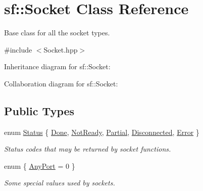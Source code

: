 \hypertarget{classsf_1_1_socket}{}\section{sf\+:\+:Socket Class Reference}
\label{classsf_1_1_socket}


Base class for all the socket types.  




{\ttfamily \#include $<$Socket.\+hpp$>$}



Inheritance diagram for sf\+:\+:Socket\+:


Collaboration diagram for sf\+:\+:Socket\+:
\subsection*{Public Types}
\begin{DoxyCompactItemize}
\item 
enum \hyperlink{classsf_1_1_socket_a51bf0fd51057b98a10fbb866246176dc}{Status} \{ \newline
\hyperlink{classsf_1_1_socket_a51bf0fd51057b98a10fbb866246176dca1de3a85bc56d3ae85b3d0f3cfd04ae90}{Done}, 
\hyperlink{classsf_1_1_socket_a51bf0fd51057b98a10fbb866246176dca8554848daae98f996e131bdeed076c09}{Not\+Ready}, 
\hyperlink{classsf_1_1_socket_a51bf0fd51057b98a10fbb866246176dca181c163fad2eaea927185d127c392706}{Partial}, 
\hyperlink{classsf_1_1_socket_a51bf0fd51057b98a10fbb866246176dcab215141f756acdc23c67fad149710eb1}{Disconnected}, 
\newline
\hyperlink{classsf_1_1_socket_a51bf0fd51057b98a10fbb866246176dca1dc9854433a28c22e192721179a2df5d}{Error}
 \}\begin{DoxyCompactList}\small\item\em Status codes that may be returned by socket functions. \end{DoxyCompactList}
\item 
enum \{ \hyperlink{classsf_1_1_socket_aca9589996f3038a260724263b12caf71a5a3c30fd128895403afc11076f461b19}{Any\+Port} = 0
 \}\begin{DoxyCompactList}\small\item\em Some special values used by sockets. \end{DoxyCompactList}
\end{DoxyCompactItemize}
